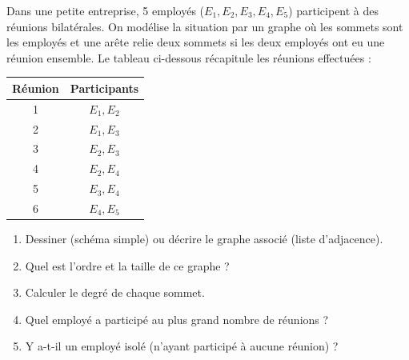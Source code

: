 \documentclass[11pt]{article}
\begin{document}
\begin{exercice}
Dans une petite entreprise, 5 employés ($E_1, E_2, E_3, E_4, E_5$) participent à des réunions bilatérales. On modélise la situation par un graphe où les sommets sont les employés et une arête relie deux sommets si les deux employés ont eu une réunion ensemble.
Le tableau ci-dessous récapitule les réunions effectuées :
\begin{center}
\begin{tabular}{|c|c|}
\hline
Réunion & Participants \\ \hline
1 & $E_1, E_2$ \\
2 & $E_1, E_3$ \\
3 & $E_2, E_3$ \\
4 & $E_2, E_4$ \\
5 & $E_3, E_4$ \\
6 & $E_4, E_5$ \\ \hline
\end{tabular}
\end{center}
\begin{enumerate}
    \item Dessiner (schéma simple) ou décrire le graphe associé (liste d'adjacence).
    \item Quel est l'ordre et la taille de ce graphe ?
    \item Calculer le degré de chaque sommet.
    \item Quel employé a participé au plus grand nombre de réunions ?
    \item Y a-t-il un employé isolé (n'ayant participé à aucune réunion) ?
\end{enumerate}
\end{exercice}
\end{document}
